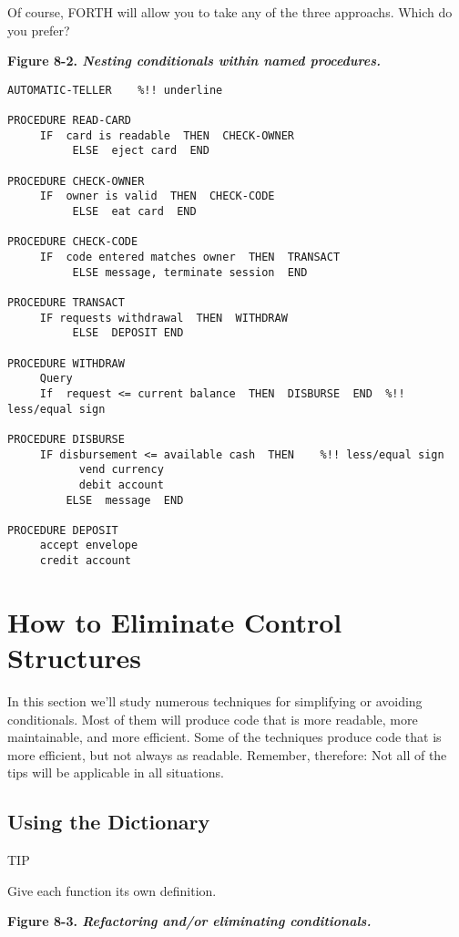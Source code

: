 Of course, FORTH will allow you to take any of the three approachs.
Which do you prefer?

\bf{Figure 8-2.} \emph{Nesting conditionals within named procedures.}

\begin{verbatim}
AUTOMATIC-TELLER	%!! underline

PROCEDURE READ-CARD
     IF  card is readable  THEN  CHECK-OWNER
          ELSE  eject card  END

PROCEDURE CHECK-OWNER
     IF  owner is valid  THEN  CHECK-CODE
          ELSE  eat card  END

PROCEDURE CHECK-CODE
     IF  code entered matches owner  THEN  TRANSACT
          ELSE message, terminate session  END

PROCEDURE TRANSACT
     IF requests withdrawal  THEN  WITHDRAW
          ELSE  DEPOSIT END

PROCEDURE WITHDRAW
     Query
     If  request <= current balance  THEN  DISBURSE  END  %!! less/equal sign

PROCEDURE DISBURSE
     IF disbursement <= available cash  THEN	%!! less/equal sign
           vend currency
           debit account
         ELSE  message  END

PROCEDURE DEPOSIT
     accept envelope
     credit account
\end{verbatim}

\section{How to Eliminate Control Structures}

In this section we'll study numerous techniques for simplifying or
avoiding conditionals. Most of them will produce code that is more
readable, more maintainable, and more efficient. Some of the techniques
produce code that is more efficient, but not always as readable.
Remember, therefore: Not all of the tips will be applicable in all
situations.

\subsection{Using the Dictionary}

TIP

Give each function its own definition.

\bf{Figure 8-3.} \emph{Refactoring and/or eliminating conditionals.}

